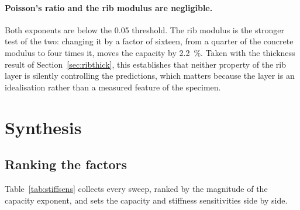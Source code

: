 \paragraph{Poisson's ratio and the rib modulus are negligible.}
Both exponents are below the \num{0.05} threshold. The rib modulus is the
stronger test of the two: changing it by a factor of sixteen, from a
quarter of the concrete modulus to four times it, moves the capacity by
\SI{2.2}{\percent}. Taken with the thickness result of
Section~\ref{sec:ribthick}, this establishes that neither property of the
rib layer is silently controlling the predictions, which matters because
the layer is an idealisation rather than a measured feature of the
specimen.

\newpage
\section{Synthesis}
\label{sec:paramsynth}
 
\subsection{Ranking the factors}
 
Table~\ref{tab:stiffsens} collects every sweep, ranked by the magnitude of
the capacity exponent, and sets the capacity and stiffness sensitivities
side by side.
 
